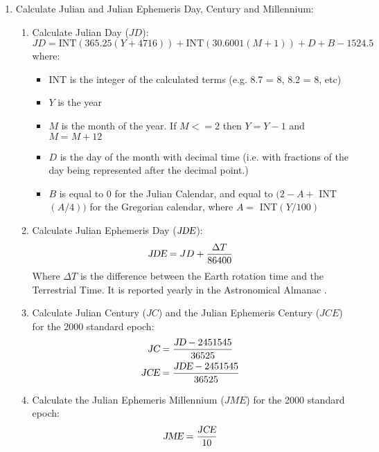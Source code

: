 { %
\begin{enumerate}
\item Calculate Julian and Julian Ephemeris Day, Century and Millennium:
\begin{enumerate}
  \item Calculate Julian Day ($JD$):
  \begin{displaymath}
  JD = \text{INT}(365.25 (Y + 4716)) + \text{INT}(30.6001 (M + 1)) + D + B -1524.5
  \end{displaymath}
  where:
  \begin{itemize}
    \item INT is the integer of the calculated terms (e.g. 8.7 = 8, 8.2 = 8, etc)
    \item $Y$ is the year
    \item $M$ is the month of the year. If $M <= 2$ then $Y = Y - 1$ and $M = M + 12$
    \item $D$ is the day of the month with decimal time (i.e. with fractions of the day 
    being represented after the decimal point.)
    \item $B$ is equal to 0 for the Julian Calendar, and equal to $(2 - A + $ INT$(A/4))$ for the
    Gregorian calendar, where $A = $ INT$(Y/100)$
  \end{itemize}
  \item Calculate Julian Ephemeris Day ($\text{\sl JDE}$):
  \begin{displaymath}
  \text{\sl JDE} = JD + \frac{\Delta T}{86400}
  \end{displaymath}
  Where $\Delta T$ is the difference between the Earth rotation time and the Terrestrial Time.
  It is reported yearly in the Astronomical Almanac \cite{astrom}.

  \item Calculate Julian Century ($JC$) and the Julian Ephemeris Century ($JCE$) for the 2000 standard epoch:
  \begin{gather*}
  \text{\sl JC} = \frac{\text{\sl JD} - 2451545}{36525} \\
  \text{\sl JCE} = \frac{\text{\sl JDE} - 2451545}{36525}
  \end{gather*}

  \item Calculate the Julian Ephemeris Millennium ($JME$) for the 2000 standard epoch:
  \begin{displaymath}
  \text{\sl JME} = \frac{\text{\sl JCE}}{10}
  \end{displaymath}


\end{enumerate}
\end{enumerate}}
